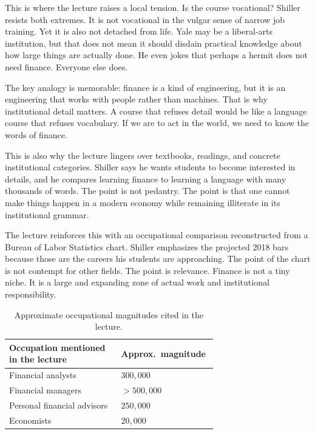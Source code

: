 This is where the lecture raises a local tension. Is the course vocational? Shiller resists both extremes. It is not vocational in the vulgar sense of narrow job training. Yet it is also not detached from life. Yale may be a liberal-arts institution, but that does not mean it should disdain practical knowledge about how large things are actually done. He even jokes that perhaps a hermit does not need finance. Everyone else does.

The key analogy is memorable: finance is a kind of engineering, but it is an engineering that works with people rather than machines. That is why institutional detail matters. A course that refuses detail would be like a language course that refuses vocabulary. If we are to act in the world, we need to know the words of finance.

This is also why the lecture lingers over textbooks, readings, and concrete institutional categories. Shiller says he wants students to become interested in details, and he compares learning finance to learning a language with many thousands of words. The point is not pedantry. The point is that one cannot make things happen in a modern economy while remaining illiterate in its institutional grammar.

The lecture reinforces this with an occupational comparison reconstructed from a Bureau of Labor Statistics chart. Shiller emphasizes the projected 2018 bars because those are the careers his students are approaching. The point of the chart is not contempt for other fields. The point is relevance. Finance is not a tiny niche. It is a large and expanding zone of actual work and institutional responsibility.

\begin{table}[h]
\centering
\begingroup
\setlength{\tabcolsep}{3pt}
\small
\begin{tabular}{|p{0.50\linewidth}|p{0.18\linewidth}|}
\hline
Occupation mentioned in the lecture & Approx.\ magnitude \\
\hline
Financial analysts & \hfill \(300{,}000\) \\
Financial managers & \hfill \(>500{,}000\) \\
Personal financial advisors & \hfill \(250{,}000\) \\
Economists & \hfill \(20{,}000\) \\
\hline
\end{tabular}
\endgroup
\caption{Approximate occupational magnitudes cited in the lecture.}
\end{table}

